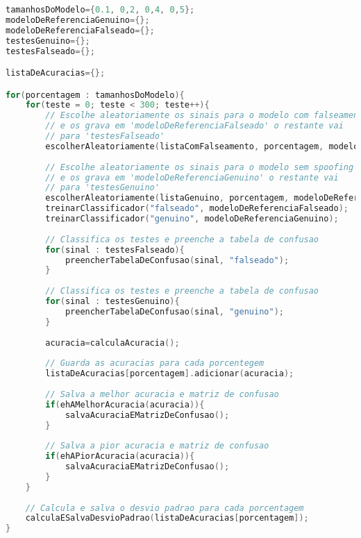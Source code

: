 \begin{lstlisting}[language=C++, caption={Algoritmo que caracteriza o procedimento 03}, label={lst:experiment03Algo}]
tamanhosDoModelo={0.1, 0,2, 0,4, 0,5};
modeloDeReferenciaGenuino={};
modeloDeReferenciaFalseado={};
testesGenuino={};
testesFalseado={};

listaDeAcuracias={};

for(porcentagem : tamanhosDoModelo){
	for(teste = 0; teste < 300; teste++){
		// Escolhe aleatoriamente os sinais para o modelo com falseamento 
		// e os grava em 'modeloDeReferenciaFalseado' o restante vai 
		// para 'testesFalseado'
		escolherAleatoriamente(listaComFalseamento, porcentagem, modeloDeReferenciaFalseado, testesFalseado);
		
		// Escolhe aleatoriamente os sinais para o modelo sem spoofing
		// e os grava em 'modeloDeReferenciaGenuino' o restante vai 
		// para 'testesGenuino'
		escolherAleatoriamente(listaGenuino, porcentagem, modeloDeReferenciaGenuino, testesGenuino);
		treinarClassificador("falseado", modeloDeReferenciaFalseado);
		treinarClassificador("genuino", modeloDeReferenciaGenuino);
		
		// Classifica os testes e preenche a tabela de confusao
		for(sinal : testesFalseado){
			preencherTabelaDeConfusao(sinal, "falseado");
		} 
		
		// Classifica os testes e preenche a tabela de confusao
		for(sinal : testesGenuino){
			preencherTabelaDeConfusao(sinal, "genuino");
		}
		
		acuracia=calculaAcuracia();
		
		// Guarda as acuracias para cada porcentegem
		listaDeAcuracias[porcentagem].adicionar(acuracia);
		
		// Salva a melhor acuracia e matriz de confusao
		if(ehAMelhorAcuracia(acuracia)){
			salvaAcuraciaEMatrizDeConfusao();
		}
		
		// Salva a pior acuracia e matriz de confusao
		if(ehAPiorAcuracia(acuracia)){
			salvaAcuraciaEMatrizDeConfusao();
		}
	}
	
	// Calcula e salva o desvio padrao para cada porcentagem
	calculaESalvaDesvioPadrao(listaDeAcuracias[porcentagem]);
}
\end{lstlisting}